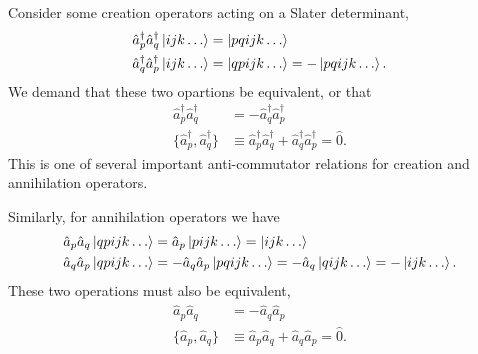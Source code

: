     Consider some creation operators acting on a Slater determinant,
    \begin{equation}
        \begin{aligned}
            \hat{a}_p^\dagger \hat{a}_q^\dagger \ket{ijk \dots} &= \ket{pqijk \dots} \\
            \hat{a}_q^\dagger \hat{a}_p^\dagger \ket{ijk \dots} &= \ket{qpijk \dots}
                = - \ket{pqijk \dots}.
        \end{aligned}
    \end{equation}
    We demand that these two opartions be equivalent, or that 
    \begin{equation}
        \begin{aligned}
            \hat{a}_p^\dagger \hat{a}_q^\dagger &= 
                -\hat{a}_q^\dagger \hat{a}_p^\dagger \\
            \{\hat{a}_p^\dagger, \hat{a}_q^\dagger\} &\equiv 
                \hat{a}_p^\dagger \hat{a}_q^\dagger + 
                \hat{a}_q^\dagger \hat{a}_p^\dagger = \hat{0}.
        \end{aligned}
    \end{equation}
    This is one of several important anti-commutator relations for creation and
    annihilation operators.

    Similarly, for annihilation operators we have
    \begin{equation}
        \begin{aligned}
            \hat{a}_p \hat{a}_q \ket{qpijk \dots} &= 
                \hat{a}_p\ket{pijk \dots} = \ket{ijk \dots} \\
            \hat{a}_q \hat{a}_p \ket{qpijk \dots} &= 
                - \hat{a}_q \hat{a}_p \ket{pqijk \dots} = 
                - \hat{a}_q \ket{qijk \dots} = - \ket{ijk \dots}.
        \end{aligned}
    \end{equation}
    These two operations must also be equivalent, 
    \begin{equation}
        \begin{aligned}
            \hat{a}_p \hat{a}_q &= 
                -\hat{a}_q \hat{a}_p \\
            \{\hat{a}_p, \hat{a}_q\} &\equiv 
                \hat{a}_p \hat{a}_q + 
                \hat{a}_q \hat{a}_p = \hat{0}.
        \end{aligned}
    \end{equation}

